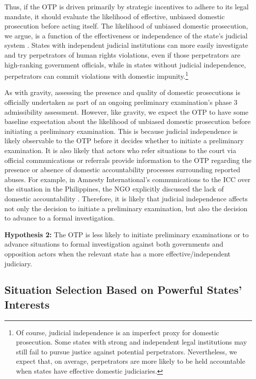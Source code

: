 Thus, if the OTP is driven primarily by strategic incentives to adhere to its legal mandate, it should evaluate the likelihood of effective, unbiased domestic prosecution before acting itself. The likelihood of unbiased domestic prosecution, we argue, is a function of the effectiveness or independence of the state's judicial system \citep{conrad2013treaties, conrad2014divergent, conrad2010stops, powell2009domestic}. States with independent judicial institutions can more easily investigate and try perpetrators of human rights violations, even if those perpetrators are high-ranking government officials, while in states without judicial independence, perpetrators can commit violations with domestic impunity.\footnote{Of course, judicial independence is an imperfect proxy for domestic prosecution. Some states with strong and independent legal institutions may still fail to pursue justice against potential perpetrators. Nevertheless, we expect that, on average, perpetrators are more likely to be held accountable when states have effective domestic judiciaries.}

As with gravity, assessing the presence and quality of domestic prosecutions is officially undertaken as part of an ongoing preliminary examination's phase 3 admissibility assessment. However, like gravity, we expect the OTP to have some baseline expectation about the likelihood of unbiased domestic prosecution before initiating a preliminary examination. This is because judicial independence is likely observable to the OTP before it decides whether to initiate a preliminary examination. It is also likely that actors who refer situations to the court via official communications or referrals provide information to the OTP regarding the presence or absence of domestic accountability processes surrounding reported abuses. For example, in Amnesty International's communications to the ICC over the situation in the Philippines, the NGO explicitly discussed the lack of domestic accountability \citep{amnesty18}. Therefore, it is likely that judicial independence affects not only the decision to initiate a preliminary examination, but also the decision to advance to a formal investigation.

\textbf{Hypothesis 2:} The OTP is less likely to initiate preliminary examinations or to advance situations to formal investigation against both governments and opposition actors when the relevant state has a more effective/independent judiciary.

\subsection*{Situation Selection Based on Powerful States' Interests}

